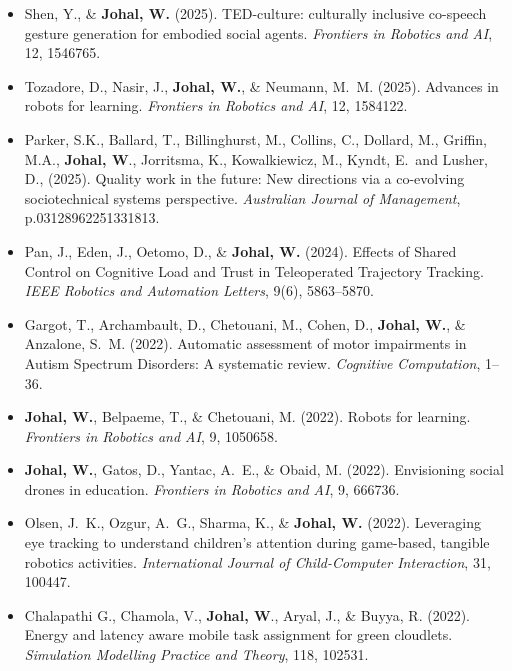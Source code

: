 \begin{itemize}[nosep]
    \renewcommand\labelitemi{$\bullet$}

    \item Shen, Y., \& \textbf{Johal, W.} (2025). TED-culture: culturally inclusive co-speech gesture generation for embodied social agents. \textit{Frontiers in Robotics and AI}, 12, 1546765.

    \item Tozadore, D., Nasir, J., \textbf{Johal, W.}, \& Neumann, M.\ M. (2025). Advances in robots for learning. \textit{Frontiers in Robotics and AI}, 12, 1584122.

    \item Parker, S.K., Ballard, T., Billinghurst, M., Collins, C., Dollard, M., Griffin, M.A., \textbf{Johal, W}., Jorritsma, K., Kowalkiewicz, M., Kyndt, E.\ and Lusher, D., (2025). Quality work in the future: New directions via a co-evolving sociotechnical systems perspective. \textit{Australian Journal of Management}, p.03128962251331813.

    \item Pan, J., Eden, J., Oetomo, D., \& \textbf{Johal, W.} (2024). Effects of Shared Control on Cognitive Load and Trust in Teleoperated Trajectory Tracking. \textit{IEEE Robotics and Automation Letters}, 9(6), 5863--5870.

    \item Gargot, T., Archambault, D., Chetouani, M., Cohen, D., \textbf{Johal, W.}, \& Anzalone, S.\ M. (2022). Automatic assessment of motor impairments in Autism Spectrum Disorders: A systematic review. \textit{Cognitive Computation}, 1--36.

    \item \textbf{Johal, W.}, Belpaeme, T., \& Chetouani, M. (2022). Robots for learning. \textit{Frontiers in Robotics and AI}, 9, 1050658.

    \item \textbf{Johal, W.}, Gatos, D., Yantac, A.\ E., \& Obaid, M. (2022). Envisioning social drones in education. \textit{Frontiers in Robotics and AI}, 9, 666736.

    \item Olsen, J.\ K., Ozgur, A.\ G., Sharma, K., \& \textbf{Johal, W.} (2022). Leveraging eye tracking to understand children's attention during game-based, tangible robotics activities. \textit{International Journal of Child-Computer Interaction}, 31, 100447.

    \item Chalapathi G., Chamola, V., \textbf{Johal, W}., Aryal, J., \& Buyya, R. (2022). Energy and latency aware mobile task assignment for green cloudlets. \textit{Simulation Modelling Practice and Theory}, 118, 102531.


\end{itemize}
